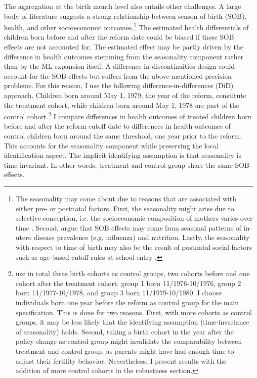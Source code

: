 The aggregation at the birth month level also entails other challenges. A large body of literature suggests a strong relationship between season of birth (SOB), health, and other socioeconomic outcomes.\footnote{The seasonality may come about due to reasons that are associated with either pre- or postnatal factors. First, the seasonality might arise due to selective conception, i.e. the socioeconomic composition of mothers varies over time \citep{buckles2013season}. Second, \cite{currie2013within} argue that SOB effects may come from seasonal patterns of in-utero disease prevalence (e.g. influenza) and nutrition. Lastly, the seasonality with respect to time of birth may also be the result of postnatal social factors such as age-based cutoff rules at school-entry \citep{black2011too}.} The estimated health differentials of children born before and after the reform date could be biased if these SOB effects are not accounted for. The estimated effect may be partly driven by the difference in health outcomes stemming from the seasonality component rather than by the ML expansion itself. A difference-in-discontinuities design could account for the SOB effects but suffers from the above-mentioned precision problems. For this reason, I use the following difference-in-differences (DiD) approach. Children born around May 1, 1979, the year of the reform, constitute the treatment cohort, while children born around May 1, 1978 are part of the control cohort.\footnote{\cite{Dustmann2012} use in total three birth cohorts as control groups, two cohorts before and one cohort after the treatment cohort: group 1 born 11/1976-10/1976, group 2 born 11/1977-10/1978, and group 3 born 11/1979-10/1980. I choose individuals born one year before the reform as control group for the main specification. This is done for two reasons. First, with more cohorts as control groups, it may be less likely that the identifying assumption (time-invariance of seasonality) holds. Second, taking a birth cohort in the year after the policy change as control group might invalidate the comparability between treatment and control group, as parents might have had enough time to adjust their fertility behavior. Nevertheless, I present results with the addition of more control cohorts in the robustness section.} I compare differences in health outcomes of treated children born before and after the reform cutoff date to differences in health outcomes of control children born around the same threshold, one year prior to the reform. This accounts for the seasonality component while preserving the local identification aspect. The implicit identifying assumption is that seasonality is time-invariant. In other words, treatment and control group share the same SOB effects.


